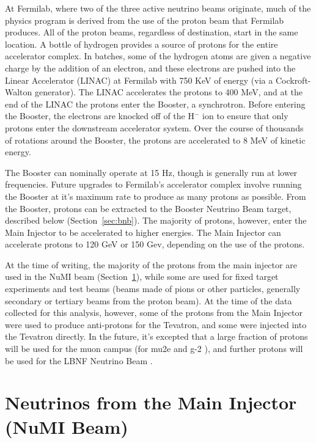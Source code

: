 At Fermilab, where two of the three active neutrino beams originate, much of the physics program is derived from the use of the proton beam that Fermilab produces.  All of the proton beams, regardless of destination, start in the same location.  A bottle of hydrogen provides a source of protons for the entire accelerator complex.  In batches, some of the hydrogen atoms are given a negative charge by the addition of an electron, and these electrons are pushed into the Linear Accelerator (LINAC) at Fermilab with 750 KeV of energy (via a Cockroft-Walton generator).  The LINAC accelerates the protons to 400 MeV, and at the end of the LINAC the protons enter the Booster, a synchrotron.  Before entering the Booster, the electrons are knocked off of the H$^-$ ion to ensure that only protons enter the downstream accelerator system.  Over the course of thousands of rotations around the Booster, the protons are accelerated to 8 MeV of kinetic energy.

The Booster can nominally operate at 15 Hz, though is generally run at lower frequencies.  Future upgrades to Fermilab's accelerator complex involve running the Booster at it's maximum rate to produce as many protons as possible.  From the Booster, protons can be extracted to the Booster Neutrino Beam target, described below (Section~\ref{sec:bnb}).  The majority of protons, however, enter the Main Injector to be accelerated to higher energies.  The Main Injector can accelerate protons to 120 GeV or 150 Gev, depending on the use of the protons.

At the time of writing, the majority of the protons from the main injector are used in the NuMI beam (Section~\ref{sec:numi_beam}), while some are used for fixed target experiments and test beams (beams made of pions or other particles, generally secondary or tertiary beams from the proton beam).  At the time of the data collected for this analysis, however, some of the protons from the Main Injector were used to produce anti-protons for the Tevatron, and some were injected into the Tevatron directly.  In the future, it's excepted that a large fraction of protons will be used for the muon campus (for mu2e and g-2 \cite{Bartoszek:2014mya} \cite{Grange:2015fou}), and further protons will be used for the LBNF Neutrino Beam \cite{DUNE}.

\section{Neutrinos from the Main Injector (NuMI Beam)}
\label{sec:numi_beam}

